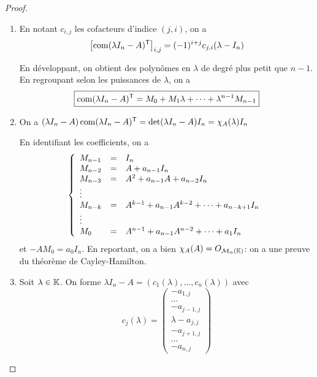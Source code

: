 \documentclass[12pt]{article}
\begin{document}
\begin{proof}
	\phantom{}
	\begin{enumerate}
		\item En notant $c_{i,j}$ les cofacteurs d'indice $(j,i)$, on a 
		\begin{equation}
			\left[\operatorname{com}(\lambda I_{n}-A)^{\mathsf{T}}\right]_{i,j}=(-1)^{i+j}c_{j,i}(\lambda-I_{n})
		\end{equation}

		En développant, on obtient des polynômes en $\lambda$ de degré plus petit que $n-1$. En regroupant selon les puissances de $\lambda$, on a 
		\begin{equation}
			\boxed{\operatorname{com}(\lambda I_{n}-A)^{\mathsf{T}}=M_{0}+M_{1}\lambda+\dots+\lambda^{n-1}M_{n-1}}
		\end{equation}

		\item On a $(\lambda I_{n}-A)\operatorname{com}(\lambda I_{n}-A)^{\mathsf{T}}=\det(\lambda I_{n}-A)I_{n}=\chi_{A}(\lambda)I_{n}$
		
		En identifiant les coefficients, on a 
		\begin{equation}
			\left\lbrace
				\begin{array}[]{lll}
					M_{n-1}&=&I_{n}\\
					M_{n-2}&=&A+a_{n-1}I_{n}\\
					M_{n-3}&=&A^{2}+a_{n-1}A+a_{n-2}I_{n}\\
					\vdots\\
					M_{n-k}&=&A^{k-1}+a_{n-1}A^{k-2}+\dots+a_{n-k+1}I_{n}\\
					\vdots\\
					M_{0}&=&A^{n-1}+a_{n-1}A^{n-2}+\dots+a_{1}I_{n}
				\end{array}
			\right.
		\end{equation}
		et $-AM_{0}=a_{0}I_{n}$. En reportant, on a bien $\chi_{A}(A)=O_{\mathcal{M}_{n}(\mathbb{K})}$: on a une preuve du théorème de Cayley-Hamilton.

		\item Soit $\lambda\in\mathbb{K}$. On forme $\lambda I_{n}-A=(c_{1}(\lambda),\dots,c_{n}(\lambda))$ avec 
		\begin{equation}
			c_{j}(\lambda)=\begin{pmatrix}
				-a_{1,j}\\\dots\\-a_{j-1,j}\\\lambda-a_{j,j}\\-a_{j+1,j}\\\dots\\-a_{n,j}
			\end{pmatrix}
		\end{equation}


\end{enumerate}
\end{proof}
\end{document}
